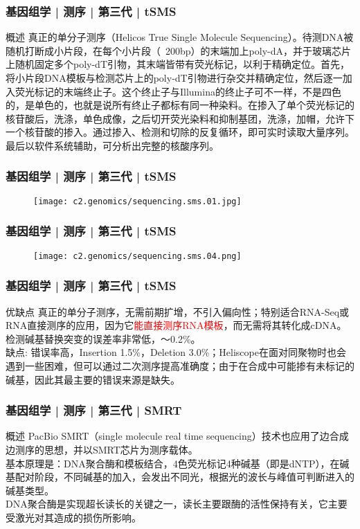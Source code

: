 \begin{frame}
  \frametitle{基因组学 | 测序 | 第三代 | tSMS}
  \begin{block}{概述}
真正的单分子测序（Helicos True Single Molecule Sequencing）。待测DNA被随机打断成小片段，在每个小片段（~200bp）的末端加上poly-dA，并于玻璃芯片上随机固定多个poly-dT引物，其末端皆带有荧光标记，以利于精确定位。首先，将小片段DNA模板与检测芯片上的poly-dT引物进行杂交并精确定位，然后逐一加入荧光标记的末端终止子。这个终止子与Illumina的终止子可不一样，不是四色的，是单色的，也就是说所有终止子都标有同一种染料。在掺入了单个荧光标记的核苷酸后，洗涤，单色成像，之后切开荧光染料和抑制基团，洗涤，加帽，允许下一个核苷酸的掺入。通过掺入、检测和切除的反复循环，即可实时读取大量序列。最后以软件系统辅助，可分析出完整的核酸序列。
  \end{block}
\end{frame}

\begin{frame}
  \frametitle{基因组学 | 测序 | 第三代 | tSMS}
  \begin{figure}
    \centering
    \texttt{[image: c2.genomics/sequencing.sms.01.jpg]}
  \end{figure}
\end{frame}

\begin{frame}
  \frametitle{基因组学 | 测序 | 第三代 | tSMS}
  \begin{figure}
    \centering
    \texttt{[image: c2.genomics/sequencing.sms.04.png]}
  \end{figure}
\end{frame}

\begin{frame}
  \frametitle{基因组学 | 测序 | 第三代 | tSMS}
  \begin{block}{优缺点}
    真正的单分子测序，无需前期扩增，不引入偏向性；特别适合RNA-Seq或RNA直接测序的应用，因为它\textcolor{red}{能直接测序RNA模板}，而无需将其转化成cDNA。检测碱基替换突变的误差率非常低，～0.2\%。\\
\vspace{1em}
缺点: 错误率高，Insertion 1.5\%，Deletion 3.0\%；Heliscope在面对同聚物时也会遇到一些困难，但可以通过二次测序提高准确度；由于在合成中可能掺有未标记的碱基，因此其最主要的错误来源是缺失。
  \end{block}
\end{frame}

\begin{frame}
  \frametitle{基因组学 | 测序 | 第三代 | SMRT}
  \begin{block}{概述}
PacBio SMRT（single molecule real time sequencing）技术也应用了边合成边测序的思想，并以SMRT芯片为测序载体。\\
\vspace{1em}
基本原理是：DNA聚合酶和模板结合，4色荧光标记4种碱基（即是dNTP），在碱基配对阶段，不同碱基的加入，会发出不同光，根据光的波长与峰值可判断进入的碱基类型。\\
\vspace{1em}
DNA聚合酶是实现超长读长的关键之一，读长主要跟酶的活性保持有关，它主要受激光对其造成的损伤所影响。
  \end{block}
\end{frame}

